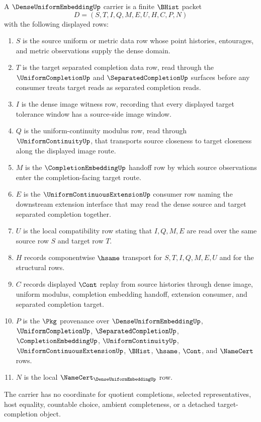 \begin{definition}
\label{def:dense-uniform-embedding-carrier}
A $\DenseUniformEmbeddingUp$ carrier is a finite $\BHist$ packet
$$
D=(S,T,I,Q,M,E,U,H,C,P,N)
$$
with the following displayed rows:
\begin{enumerate}
\item $S$ is the source uniform or metric data row whose point histories, entourages, and metric observations supply the dense domain.
\item $T$ is the target separated completion data row, read through the $\UniformCompletionUp$ and $\SeparatedCompletionUp$ surfaces before any consumer treats target reads as separated completion reads.
\item $I$ is the dense image witness row, recording that every displayed target tolerance window has a source-side image window.
\item $Q$ is the uniform-continuity modulus row, read through $\UniformContinuityUp$, that transports source closeness to target closeness along the displayed image route.
\item $M$ is the $\CompletionEmbeddingUp$ handoff row by which source observations enter the completion-facing target route.
\item $E$ is the $\UniformContinuousExtensionUp$ consumer row naming the downstream extension interface that may read the dense source and target separated completion together.
\item $U$ is the local compatibility row stating that $I,Q,M,E$ are read over the same source row $S$ and target row $T$.
\item $H$ records componentwise $\hsame$ transport for $S,T,I,Q,M,E,U$ and for the structural rows.
\item $C$ records displayed $\Cont$ replay from source histories through dense image, uniform modulus, completion embedding handoff, extension consumer, and separated completion target.
\item $P$ is the $\Pkg$ provenance over $\DenseUniformEmbeddingUp$, $\UniformCompletionUp$, $\SeparatedCompletionUp$, $\CompletionEmbeddingUp$, $\UniformContinuityUp$, $\UniformContinuousExtensionUp$, $\BHist$, $\hsame$, $\Cont$, and $\NameCert$ rows.
\item $N$ is the local $\NameCert_{\DenseUniformEmbeddingUp}$ row.
\end{enumerate}
The carrier has no coordinate for quotient completions, selected representatives, host equality, countable choice, ambient completeness, or a detached target-completion object.
\end{definition}

